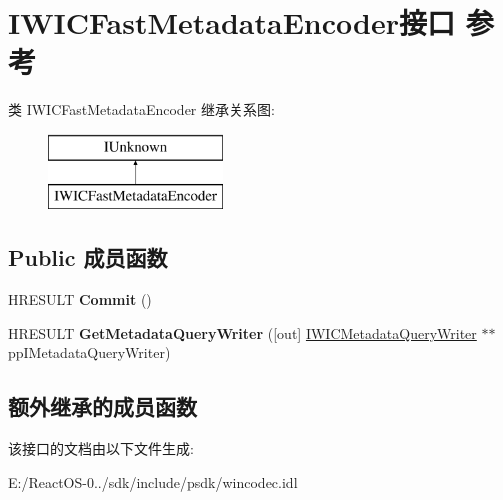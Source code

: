 \hypertarget{interface_i_w_i_c_fast_metadata_encoder}{}\section{I\+W\+I\+C\+Fast\+Metadata\+Encoder接口 参考}
\label{interface_i_w_i_c_fast_metadata_encoder}
类 I\+W\+I\+C\+Fast\+Metadata\+Encoder 继承关系图\+:\begin{figure}[H]
\begin{center}
\leavevmode
\includegraphics[height=2.000000cm]{interface_i_w_i_c_fast_metadata_encoder}
\end{center}
\end{figure}
\subsection*{Public 成员函数}
\begin{DoxyCompactItemize}
\item 
\mbox{\label{interface_i_w_i_c_fast_metadata_encoder_ad0309f825c953edb91e302526a7b968b}} 
H\+R\+E\+S\+U\+LT {\bfseries Commit} ()
\item 
\mbox{\label{interface_i_w_i_c_fast_metadata_encoder_a2db33fbaefcd4ce628b1138a31a9a2cf}} 
H\+R\+E\+S\+U\+LT {\bfseries Get\+Metadata\+Query\+Writer} (\mbox{[}out\mbox{]} \hyperlink{interface_i_w_i_c_metadata_query_writer}{I\+W\+I\+C\+Metadata\+Query\+Writer} $\ast$$\ast$pp\+I\+Metadata\+Query\+Writer)
\end{DoxyCompactItemize}
\subsection*{额外继承的成员函数}


该接口的文档由以下文件生成\+:\begin{DoxyCompactItemize}
\item 
E\+:/\+React\+O\+S-\/0../sdk/include/psdk/wincodec.\+idl\end{DoxyCompactItemize}
